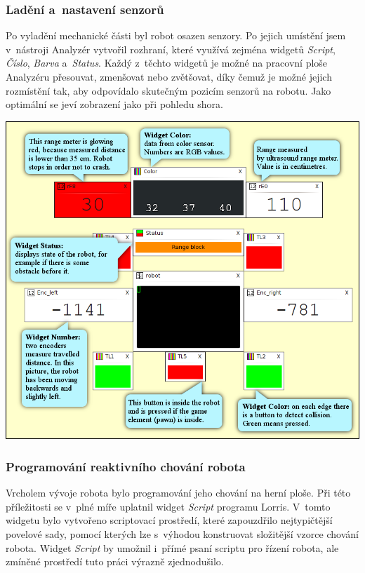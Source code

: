 \documentclass[12pt, a4paper, oneside]{article}
\newcommand{\It}{\textit}  %
\begin{document}
\subsubsection{Ladění a~nastavení senzorů}
Po vyladění mechanické části byl robot osazen senzory. Po jejich umístění jsem v~nástroji Analyzér vytvořil rozhraní, které využívá zejména widgetů \It{Script}, \It{Číslo}, \It{Barva} a~\It{Status}. Každý z~těchto widgetů je možné na pracovní ploše Analyzéru přesouvat, zmenšovat nebo zvětšovat, díky čemuž je možné jejich rozmístění tak, aby odpovídalo skutečným pozicím senzorů na robotu. Jako optimální se jeví zobrazení jako při pohledu shora.
\vspace{10mm}
\begin{center}
\includegraphics[width=\textwidth]{img/sensors_david.png}
\end{center}

\newpage
\subsubsection{Programování reaktivního chování robota}
Vrcholem vývoje robota bylo programování jeho chování na herní ploše. Při této příležitosti se v~plné míře uplatnil widget \It{Script} programu Lorris. V~tomto widgetu bylo vytvořeno scriptovací prostředí, které zapouzdřilo nejtypičtější povelové sady, pomocí kterých lze s~výhodou konstruovat složitější vzorce chování robota. Widget \It{Script} by umožnil i~přímé psaní scriptu pro řízení robota, ale zmíněné prostředí tuto práci výrazně zjednodušilo.
\end{document}
